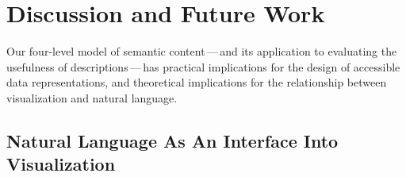 \section{Discussion and Future Work}
\label{section:6}
Our four-level model of semantic content\,---\,and its application to evaluating the usefulness of descriptions\,---\,has practical implications for the design of accessible data representations, and theoretical implications for the relationship between visualization and natural language.

\subsection{Natural Language As An Interface Into Visualization}
\label{section:practicalImplications}


